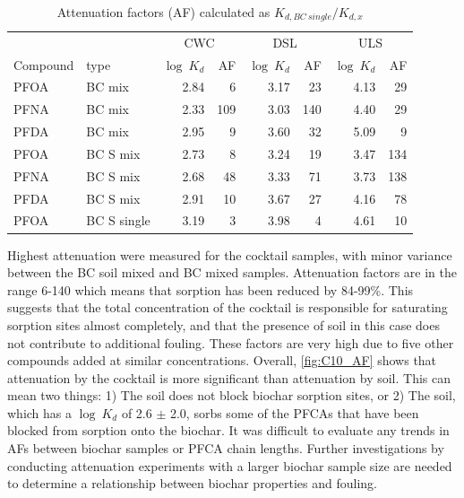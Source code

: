 \begin{table}
\centering
\caption{Attenuation factors (AF) calculated as $K_{d,BC~single}/K_{d,x}$}
\label{tab:attenuation}
\begin{tabular}{llrrrrrr} \toprule
 &  & \multicolumn{2}{c}{CWC} & \multicolumn{2}{c}{DSL} & \multicolumn{2}{c}{ULS} \\ \cmidrule(l){3-4} \cmidrule(l){5-6} \cmidrule(l){7-8}
Compound & type & $\log~K_d$ & AF & $\log~K_d$ & AF & $\log~K_d$ & AF \\ \midrule
PFOA & BC mix & 2.84 & 6 & 3.17 & 23 & 4.13 & 29 \\
PFNA & BC mix & 2.33 & 109 & 3.03 & 140 & 4.40 & 29 \\
PFDA & BC mix & 2.95 & 9 & 3.60 & 32 & 5.09 & 9 \\ \addlinespace \hline \addlinespace
PFOA & BC S mix & 2.73 & 8 & 3.24 & 19 & 3.47 & 134 \\
PFNA & BC S mix & 2.68 & 48 & 3.33 & 71 & 3.73 & 138 \\
PFDA & BC S mix & 2.91 & 10 & 3.67 & 27 & 4.16 & 78 \\ \addlinespace \hline \addlinespace
PFOA & BC S single & 3.19 & 3 & 3.98 & 4 & 4.61 & 10 \\ \bottomrule
\end{tabular}
\end{table}

Highest attenuation were measured for the cocktail samples, with minor variance between the BC soil mixed and BC mixed samples. Attenuation factors are in the range 6-140 which means that sorption has been reduced by 84-99\%. This suggests that the total concentration of the cocktail is responsible for saturating sorption sites almost completely, and that the presence of soil in this case does not contribute to additional fouling. These factors are very high due to five other compounds added at similar concentrations. Overall, \cref{fig:C10_AF} shows that attenuation by the cocktail is more significant than attenuation by soil. This can mean two things: 1) The soil does not block biochar sorption sites, or 2) The soil, which has a $\log~K_d$ of 2.6 $\pm$ 2.0, sorbs some of the PFCAs that have been blocked from sorption onto the biochar. It was difficult to evaluate any trends in AFs between biochar samples or PFCA chain lengths. Further investigations by conducting attenuation experiments with a larger biochar sample size are needed to determine a relationship between biochar properties and fouling. 

